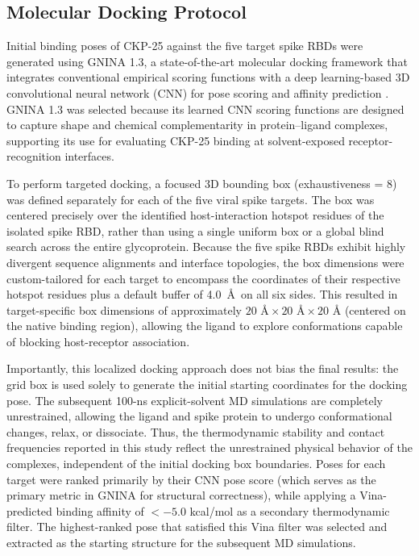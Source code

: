 \documentclass[pharmaceuticals,article,submit,pdftex,moreauthors]{Definitions/mdpi}
\begin{document}
\subsection{Molecular Docking Protocol}
Initial binding poses of CKP-25 against the five target spike RBDs were generated using GNINA 1.3, a state-of-the-art molecular docking framework that integrates conventional empirical scoring functions with a deep learning-based 3D convolutional neural network (CNN) for pose scoring and affinity prediction \cite{mcnutt2025gnina}. GNINA 1.3 was selected because its learned CNN scoring functions are designed to capture shape and chemical complementarity in protein--ligand complexes, supporting its use for evaluating CKP-25 binding at solvent-exposed receptor-recognition interfaces.

To perform targeted docking, a focused 3D bounding box (exhaustiveness = 8) was defined separately for each of the five viral spike targets. The box was centered precisely over the identified host-interaction hotspot residues of the isolated spike RBD, rather than using a single uniform box or a global blind search across the entire glycoprotein. Because the five spike RBDs exhibit highly divergent sequence alignments and interface topologies, the box dimensions were custom-tailored for each target to encompass the coordinates of their respective hotspot residues plus a default buffer of 4.0~\AA\ on all six sides. This resulted in target-specific box dimensions of approximately $20\text{ \AA} \times 20\text{ \AA} \times 20\text{ \AA}$ (centered on the native binding region), allowing the ligand to explore conformations capable of blocking host-receptor association.

Importantly, this localized docking approach does not bias the final results: the grid box is used solely to generate the initial starting coordinates for the docking pose. The subsequent 100-ns explicit-solvent MD simulations are completely unrestrained, allowing the ligand and spike protein to undergo conformational changes, relax, or dissociate. Thus, the thermodynamic stability and contact frequencies reported in this study reflect the unrestrained physical behavior of the complexes, independent of the initial docking box boundaries. Poses for each target were ranked primarily by their CNN pose score (which serves as the primary metric in GNINA for structural correctness), while applying a Vina-predicted binding affinity of $< -5.0$ kcal/mol as a secondary thermodynamic filter. The highest-ranked pose that satisfied this Vina filter was selected and extracted as the starting structure for the subsequent MD simulations.
\end{document}
